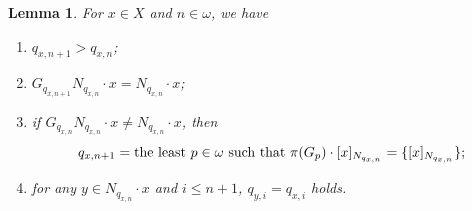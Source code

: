 \documentclass[11pt]{amsart}
\newtheorem{lemma}[theorem]{Lemma}
\theoremstyle{definition}
\theoremstyle{remark}
\numberwithin{equation}{section}
\def\itx#1{{\mbox{\textrm{ #1 }}}}
\def\itxl#1{{\mbox{\textrm{#1 }}}}
\begin{document}


\begin{lemma}\label{property of qxn}
    For $x\in X$ and $n\in\omega$, we have
    \begin{enumerate}
        \item $q_{x,n+1}>q_{x,n}$;
        \item $G_{q_{x,n+1}}N_{q_{x,n}}\cdot x=N_{q_{x,n}}\cdot x$;
        \item if $G_{q_{x,n}}N_{q_{x,n}}\cdot x\neq N_{q_{x,n}}\cdot x$, then
        \begin{equation*}
            q_{x,n+1}=\itxl{the least}p\in\omega\itx{such that}\pi(G_p)\cdot[x]_{N_{q_{x,n}}}=\{[x]_{N_{q_{x,n}}}\};
        \end{equation*}
        \item for any $y\in N_{q_{x,n}}\cdot x$ and $i\leq n+1$, $q_{y,i}=q_{x,i}$ holds.
    \end{enumerate}
\end{lemma}
\end{document}

